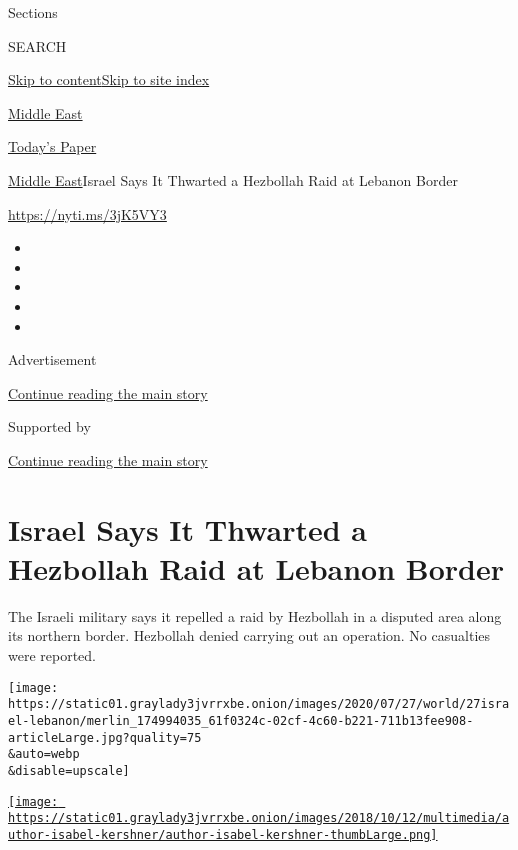 Sections

SEARCH

\protect\hyperlink{site-content}{Skip to
content}\protect\hyperlink{site-index}{Skip to site index}

\href{https://www.nytimes3xbfgragh.onion/section/world/middleeast}{Middle
East}

\href{https://myaccount.nytimes3xbfgragh.onion/auth/login?response_type=cookie\&client_id=vi}{}

\href{https://www.nytimes3xbfgragh.onion/section/todayspaper}{Today's
Paper}

\href{/section/world/middleeast}{Middle East}\textbar{}Israel Says It
Thwarted a Hezbollah Raid at Lebanon Border

\url{https://nyti.ms/3jK5VY3}

\begin{itemize}
\item
\item
\item
\item
\item
\end{itemize}

Advertisement

\protect\hyperlink{after-top}{Continue reading the main story}

Supported by

\protect\hyperlink{after-sponsor}{Continue reading the main story}

\hypertarget{israel-says-it-thwarted-a-hezbollah-raid-at-lebanon-border}{%
\section{Israel Says It Thwarted a Hezbollah Raid at Lebanon
Border}\label{israel-says-it-thwarted-a-hezbollah-raid-at-lebanon-border}}

The Israeli military says it repelled a raid by Hezbollah in a disputed
area along its northern border. Hezbollah denied carrying out an
operation. No casualties were reported.

\texttt{[image: https://static01.graylady3jvrrxbe.onion/images/2020/07/27/world/27israel-lebanon/merlin\_174994035\_61f0324c-02cf-4c60-b221-711b13fee908-articleLarge.jpg?quality=75\\\&auto=webp\\\&disable=upscale]}

\href{https://www.nytimes3xbfgragh.onion/by/isabel-kershner}{\texttt{[image: https://static01.graylady3jvrrxbe.onion/images/2018/10/12/multimedia/author-isabel-kershner/author-isabel-kershner-thumbLarge.png]}}

